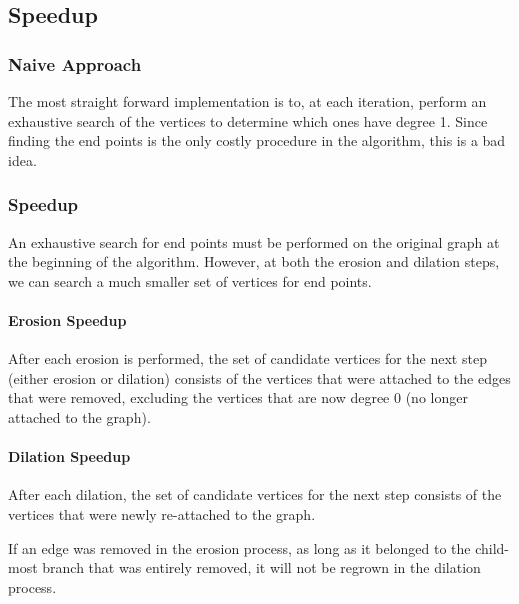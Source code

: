 \documentclass{ComputationalAlgorithmsArticle}
\begin{document}
\subsection{Speedup}
\subsubsection{Naive Approach}
The most straight forward implementation is to, at each iteration, perform an exhaustive search of the vertices to determine which ones have degree 1. Since finding the end points is the only costly procedure in the algorithm, this is a bad idea.

\subsubsection{Speedup}
An exhaustive search for end points must be performed on the original graph at the beginning of the algorithm. However, at both the erosion and dilation steps, we can search a much smaller set of vertices for end points.
\paragraph{Erosion Speedup}
After each erosion is performed, the set of candidate vertices for the next step (either erosion or dilation) consists of the vertices that were attached to the edges that were removed, excluding the vertices that are now degree 0 (no longer attached to the graph).
\paragraph{Dilation Speedup}
After each dilation, the set of candidate vertices for the next step consists of the vertices that were newly re-attached to the graph.

If an edge was removed in the erosion process, as long as it belonged to the child-most branch that was entirely removed, it will not be regrown in the dilation process.

\end{document}
